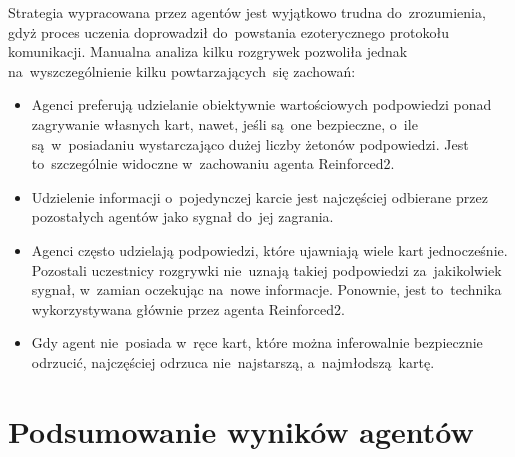 \documentclass[declaration,shortabstract,inz]{iithesis}
\begin{document}
Strategia wypracowana przez agentów jest wyjątkowo trudna do~zrozumienia, gdyż proces uczenia doprowadził do~powstania ezoterycznego protokołu komunikacji. Manualna analiza kilku rozgrywek pozwoliła jednak na~wyszczególnienie kilku powtarzających~się zachowań:
\begin{itemize}
	\item Agenci preferują udzielanie obiektywnie wartościowych podpowiedzi ponad zagrywanie własnych kart, nawet, jeśli są~one bezpieczne, o~ile są~w~posiadaniu wystarczająco dużej liczby żetonów podpowiedzi. Jest to~szczególnie widoczne w~zachowaniu agenta Reinforced2.
	\item Udzielenie informacji o~pojedynczej karcie jest najczęściej odbierane przez pozostałych agentów jako sygnał do~jej zagrania.
	\item Agenci często udzielają podpowiedzi, które ujawniają wiele kart jednocześnie. Pozostali uczestnicy rozgrywki nie~uznają takiej podpowiedzi za~jakikolwiek sygnał, w~zamian oczekując na~nowe informacje. Ponownie, jest to~technika wykorzystywana głównie przez agenta Reinforced2.
	\item Gdy agent nie~posiada w~ręce kart, które można inferowalnie bezpiecznie odrzucić, najczęściej odrzuca nie~najstarszą, a~najmłodszą kartę.
\end{itemize}

\chapter{Podsumowanie wyników agentów}
 
\end{document}
